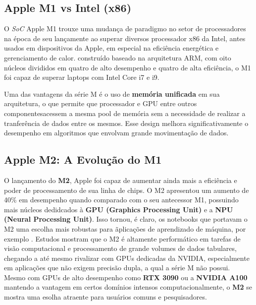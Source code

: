 \documentclass[a4paper,times,12pt]{article}
\begin{document}
\subsection{Apple M1 vs Intel (x86)}
\hspace{+15pt}
O \textit{SoC} Apple M1 trouxe uma mudança de paradigmo no setor de processadores na época de seu lançamente ao superar diversos processador x86 da Intel, antes usados em dispositivos da Apple, em especial na eficiência energética e gerenciamento de calor. construído baseado na arquitetura ARM, com oito núcleos divididos em quatro de alto desempenho e quatro de alta eficiência, o M1 foi capaz de superar laptops com Intel Core i7 e i9.

Uma das vantagens da série M é o uso de \textbf{memória unificada} em sua arquitetura, o que permite que processador e GPU entre outros componentesacessem a mesma pool de memória sem a necessidade de realizar a tranferência de dados entre os mesmos.\cite{apple_silicon_potential} Esse design melhora significativamente o desempenho em algoritmos que envolvam grande movimentação de dados.\cite{apple_m_vs_intel}

\subsection{Apple M2: A Evolução do M1}
\hspace{+15pt}
O lançamento do \textbf{M2}, Apple foi capaz de aumentar ainda mais a eficiência e poder de processamento de sua linha de chips. O M2 apresentou um aumento de 40\% em desempenho quando comparado com o seu antecessor M1, possuindo mais núcleos dedidcados à \textbf{GPU (Graphics Processing Unit)} e a \textbf{NPU (Neural Processing Unit)}. Isso tornou, é claro, os notebooks que portavam o M2 uma escolha mais robustas para ãplicações de aprendizado de máquina, por exemplo \cite{usability_ml}. Estudos mostram que o M2 é altamente performático em tarefas de visão computacional e processamento de grande volumes de dados tabulares, chegando a até mesmo rivalizar com GPUs dedicadas da NVIDIA, especialmente em aplicações que não exigem precisão dupla, a qual a série M não possui. Mesmo com GPUs de alto desempenho como \textbf{RTX 3090} ou a \textbf{NVIDIA A100} mantendo a vantagem em certos domínios intensos computacionalmente, o \textbf{M2} se mostra uma esolha atraente para usuários comuns e pesquisadores.\cite{usability_ml}
\end{document}
